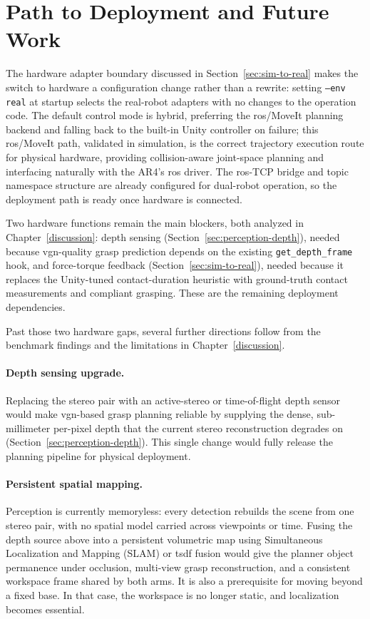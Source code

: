 \documentclass[
     12pt,
     a4paper,
     BCOR=10mm,
     DIV=14,
     listof=totoc,
     bibliography=totoc,
     parskip,
     twoside,
     headsepline
     ]{scrreprt}
\begin{document}
\section{Path to Deployment and Future Work}
The hardware adapter boundary discussed in Section~\ref{sec:sim-to-real} makes the switch to hardware a configuration change rather than a rewrite: setting \texttt{--env real} at startup selects the real-robot adapters with no changes to the operation code. The default control mode is hybrid, preferring the \gls{ros}/MoveIt planning backend and falling back to the built-in Unity controller on failure; this \gls{ros}/MoveIt path, validated in simulation, is the correct trajectory execution route for physical hardware, providing collision-aware joint-space planning and interfacing naturally with the AR4's \gls{ros} driver. The \gls{ros}-TCP bridge and topic namespace structure are already configured for dual-robot operation, so the deployment path is ready once hardware is connected.

Two hardware functions remain the main blockers, both analyzed in Chapter~\ref{discussion}: depth sensing (Section~\ref{sec:perception-depth}), needed because \gls{vgn}-quality grasp prediction depends on the existing \texttt{get\_depth\_frame} hook, and force-torque feedback (Section~\ref{sec:sim-to-real}), needed because it replaces the Unity-tuned contact-duration heuristic with ground-truth contact measurements and compliant grasping. These are the remaining deployment dependencies.

Past those two hardware gaps, several further directions follow from the benchmark findings and the limitations in Chapter~\ref{discussion}.

\paragraph{Depth sensing upgrade.} Replacing the stereo pair with an active-stereo or time-of-flight depth sensor would make \gls{vgn}-based grasp planning reliable by supplying the dense, sub-millimeter per-pixel depth that the current stereo reconstruction degrades on (Section~\ref{sec:perception-depth}). This single change would fully release the planning pipeline for physical deployment.

\paragraph{Persistent spatial mapping.} Perception is currently memoryless: every detection rebuilds the scene from one stereo pair, with no spatial model carried across viewpoints or time. Fusing the depth source above into a persistent volumetric map using Simultaneous Localization and Mapping (SLAM) or \gls{tsdf} fusion would give the planner object permanence under occlusion, multi-view grasp reconstruction, and a consistent workspace frame shared by both arms. It is also a prerequisite for moving beyond a fixed base. In that case, the workspace is no longer static, and localization becomes essential.
\end{document}
